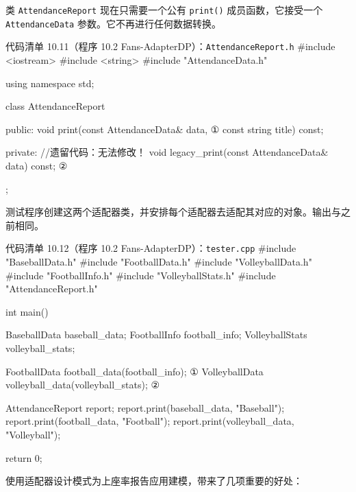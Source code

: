 类 \texttt{Attendance\allowbreak{}Report} 现在只需要一个公有 \texttt{print()} 成员函数，它接受一个 \texttt{Attendance\allowbreak{}Data} 参数。它不再进行任何数据转换。

\begin{codeboxt}{代码清单 10.11（程序 10.2 Fans-AdapterDP）：\texttt{Attendance\allowbreak{}Report.\allowbreak{}h}}
#include <iostream>
#include <string>
#include "AttendanceData.h"

using namespace std;

class AttendanceReport
{
public:
    void print(const AttendanceData& data, ①
               const string title) const;

private:
    //遗留代码：无法修改！
    void legacy_print(const AttendanceData& data) const;          ②
};
\end{codeboxt}
\par
{}\par

测试程序创建这两个适配器类，并安排每个适配器去适配其对应的对象。输出与之前相同。

\begin{codeboxt}{代码清单 10.12（程序 10.2 Fans-AdapterDP）：\texttt{tester.\allowbreak{}cpp}}
#include "BaseballData.h"
#include "FootballData.h"
#include "VolleyballData.h"
#include "FootballInfo.h"
#include "VolleyballStats.h"
#include "AttendanceReport.h"

int main()
{
    BaseballData    baseball_data;
    FootballInfo    football_info;
    VolleyballStats volleyball_stats;

    FootballData   football_data(football_info);        ①
    VolleyballData volleyball_data(volleyball_stats);   ②

    AttendanceReport report;
    report.print(baseball_data,   "Baseball");
    report.print(football_data,   "Football");
    report.print(volleyball_data, "Volleyball");

    return 0;
}
\end{codeboxt}
\par
{}\par


使用适配器设计模式为上座率报告应用建模，带来了几项重要的好处：

